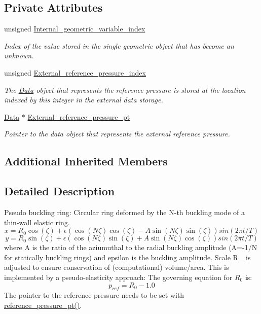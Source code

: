 \subsection*{Private Attributes}
\begin{DoxyCompactItemize}
\item 
unsigned \hyperlink{classoomph_1_1PseudoBucklingRingElement_ac31e920cff8bff50372bc28b9525b990}{Internal\+\_\+geometric\+\_\+variable\+\_\+index}
\begin{DoxyCompactList}\small\item\em Index of the value stored in the single geometric object that has become an unknown. \end{DoxyCompactList}\item 
unsigned \hyperlink{classoomph_1_1PseudoBucklingRingElement_a5be4c42822597f8fe8d73c4188f7e81e}{External\+\_\+reference\+\_\+pressure\+\_\+index}
\begin{DoxyCompactList}\small\item\em The \hyperlink{classoomph_1_1Data}{Data} object that represents the reference pressure is stored at the location indexed by this integer in the external data storage. \end{DoxyCompactList}\item 
\hyperlink{classoomph_1_1Data}{Data} $\ast$ \hyperlink{classoomph_1_1PseudoBucklingRingElement_a236c62ff5aa7f3daab7861cea26c6bbd}{External\+\_\+reference\+\_\+pressure\+\_\+pt}
\begin{DoxyCompactList}\small\item\em Pointer to the data object that represents the external reference pressure. \end{DoxyCompactList}\end{DoxyCompactItemize}
\subsection*{Additional Inherited Members}


\subsection{Detailed Description}
Pseudo buckling ring\+: Circular ring deformed by the N-\/th buckling mode of a thin-\/wall elastic ring. \[ x = R_0 \cos(\zeta) + \epsilon \left( \cos(N \zeta) \cos(\zeta) - A \sin(N \zeta) \sin(\zeta) \right) sin(2 \pi t/T) \] \[ y = R_0 \sin(\zeta) + \epsilon \left( \cos(N \zeta) \sin(\zeta) + A \sin(N \zeta) \cos(\zeta) \right) sin(2 \pi t/T) \] where A is the ratio of the aziumuthal to the radial buckling amplitude (A=-\/1/N for statically buckling rings) and epsilon is the buckling amplitude. Scale R\+\_ is adjusted to ensure conservation of (computational) volume/area. This is implemented by a pseudo-\/elasticity approach\+: The governing equation for $ R_0 $ is\+: \[ p_{ref} = R_0 - 1.0 \] The pointer to the reference pressure needs to be set with \hyperlink{classoomph_1_1PseudoBucklingRingElement_aee6f3e5157ff065ddc132d24496b9378}{reference\+\_\+pressure\+\_\+pt()}. 

